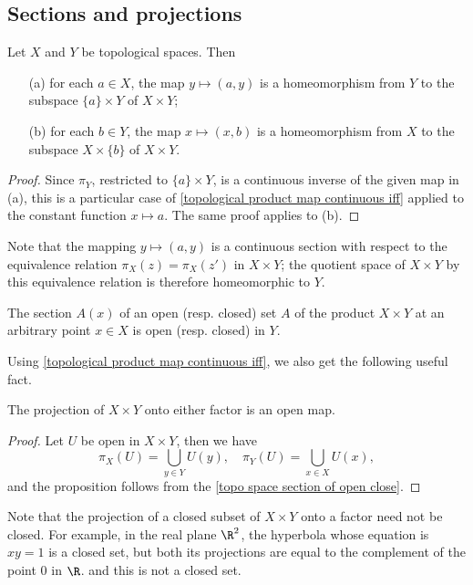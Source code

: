 \subsection{Sections and projections}
\begin{proposition}\label{topo space section map homeomorphism}
Let $X$ and $Y$ be topological spaces. Then
\begin{itemize}
\item[(a)] for each $a\in X$, the map $y\mapsto(a,y)$ is a homeomorphism from $Y$ to the subspace $\{a\}\times Y$ of $X\times Y$;
\item[(b)] for each $b\in Y$, the map $x\mapsto(x,b)$ is a homeomorphism from $X$ to the subspace $X\times\{b\}$ of $X\times Y$.
\end{itemize}
\end{proposition}
\begin{proof}
Since $\pi_Y$, restricted to $\{a\}\times Y$, is a continuous inverse of the given map in (a), this is a particular case of \cref{topological product map continuous iff} applied to the constant function $x\mapsto a$. The same proof applies to (b).
\end{proof}
Note that the mapping $y\mapsto(a,y)$ is a continuous section with respect to the equivalence relation $\pi_X(z)=\pi_X(z')$ in $X\times Y$; the quotient space of $X\times Y$ by this equivalence relation is therefore homeomorphic to $Y$.
\begin{corollary}\label{topo space section of open close}
The section $A(x)$ of an open (resp. closed) set $A$ of the product $X\times Y$ at an arbitrary point $x\in X$ is open (resp. closed) in $Y$.
\end{corollary}
Using \cref{topological product map continuous iff}, we also get the following useful fact.
\begin{proposition}\label{topo space projection is open}
The projection of $X\times Y$ onto either factor is an open map.
\end{proposition}
\begin{proof}
Let $U$ be open in $X\times Y$, then we have 
\[\pi_X(U)=\bigcup_{y\in Y}U(y),\quad\pi_Y(U)=\bigcup_{x\in X}U(x),\]
and the proposition follows from the \cref{topo space section of open close}.
\end{proof}
Note that the projection of a closed subset of $X\times Y$ onto a factor need not be closed. For example, in the real plane $\R^2$, the hyperbola whose equation is $xy=1$ is a closed set, but both its projections are equal to the complement of the point $0$ in $\R$. and this is not a closed set.
